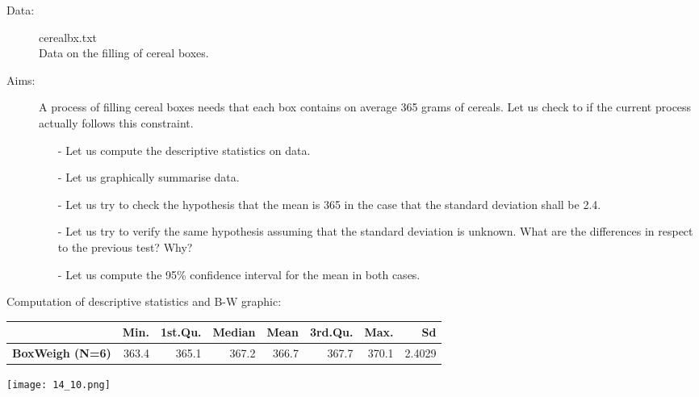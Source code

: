

\begin{frame} 
  \begin{description}
    \item[Data:] cerealbx.txt\\ 
      Data on the filling of cereal boxes.
    \item[Aims: ]
      \begin{small}
        A process of filling cereal boxes needs that each box contains on average 365 grams of cereals. Let us check to if the current process actually follows this constraint.

        \begin{itemize}
          \item[-] Let us compute the descriptive statistics on data.
          \item[-] Let us graphically summarise data.
          \item[-] Let us try to check the hypothesis that the mean is 365 in the case that the standard deviation shall be 2.4.
          \item[-] Let us try to verify the same hypothesis assuming that the standard deviation is unknown. What are the differences in respect to the previous test? Why?
          \item[-] Let us compute the 95\%  confidence interval for the mean in both cases.
        \end{itemize}
      \end{small}
  \end{description}
\end{frame}

\begin{frame}
  Computation of descriptive statistics and B-W graphic:\\
  \vspace{.3cm}
  \begin{footnotesize}
    \begin{tabular}{|l|rrrrrrr|}
      \hline
      & \textbf{Min}. & 1\textbf{st.Qu}. & \textbf{Median} & \textbf{Mean} & \textbf{3rd.Qu.} & \textbf{Max.} & \textbf{Sd}\\
      \hline
      \textbf{BoxWeigh (N=6)} & 363.4 & 365.1 & 367.2 & 366.7 & 367.7 & 370.1 & 2.4029\\
      \hline	
    \end{tabular}
  \end{footnotesize}
  \begin{center}
    \texttt{[image: 14\_10.png]}
  \end{center}
\end{frame}

